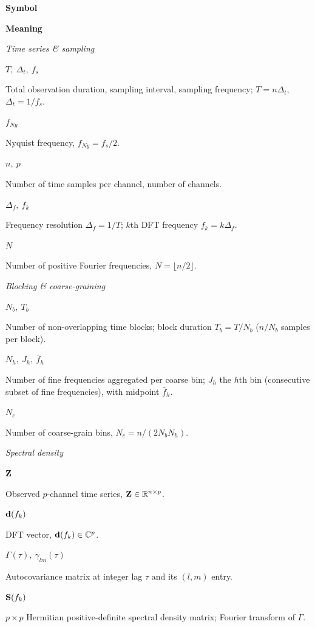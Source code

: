 \begin{table}[t]
    \centering
    \footnotesize
    \begingroup
    \setlength{\fboxsep}{6pt}%
    \newcommand{\defitem}[2]{%
        \parbox[t]{0.18\textwidth}{\raggedright #1}\hfill
        \parbox[t]{0.78\textwidth}{\raggedright #2}\par\smallskip
    }
    \newcommand{\groupplain}[2]{%
        \par\addvspace{2pt}%
        \noindent\parbox{\textwidth}{\textit{#1}\par\smallskip #2}\par
        \addvspace{2pt}%
    }
    \newcommand{\groupshaded}[2]{%
        \par\addvspace{2pt}%
        \noindent\colorbox{gray!8}{%
            \parbox{\dimexpr\textwidth-2\fboxsep\relax}{%
                \textit{#1}\par\smallskip #2%
            }%
        }\par
        \addvspace{2pt}%
    }
    \noindent\hrulefill\par\smallskip
    \noindent\parbox[t]{0.18\textwidth}{\textbf{Symbol}}\hfill
    \parbox[t]{0.78\textwidth}{\textbf{Meaning}}\par\smallskip
    \hrulefill\par\smallskip

    \groupshaded{Time series \& sampling}{%
        \defitem{$T,\ \Delta_t,\ f_s$}{Total observation duration, sampling interval, sampling frequency; $T=n\Delta_t$, $\Delta_t=1/f_s$.}
        \defitem{$f_{Ny}$}{Nyquist frequency, $f_{Ny}=f_s/2$.}
        \defitem{$n,\ p$}{Number of time samples per channel, number of channels.}
        \defitem{$\Delta_f,\ f_k$}{Frequency resolution $\Delta_f=1/T$; $k$th DFT frequency $f_k=k\Delta_f$.}
        \defitem{$N$}{Number of positive Fourier frequencies, $N=\lfloor n/2\rfloor$.}
    }

    \groupplain{Blocking \& coarse-graining}{%
        \defitem{$N_b,\ T_b$}{Number of non-overlapping time blocks; block duration $T_b=T/N_b$ ($n/N_b$ samples per block).}
        \defitem{$N_h,\ J_h,\ \bar{f}_h$}{Number of fine frequencies aggregated per coarse bin; $J_h$ the $h$th bin (consecutive subset of fine frequencies), with midpoint $\bar f_h$.}
        \defitem{$N_c$}{Number of coarse-grain bins, $N_c=n/(2N_bN_h)$.}
    }

    \groupshaded{Spectral density}{%
        \defitem{$\Z$}{Observed $p$-channel time series, $\Z\in\mathbb{R}^{n\times p}$.}
        \defitem{$\d(f_k)$}{DFT vector, $\d(f_k)\in\mathbb{C}^p$.}
        \defitem{$\Gamma(\tau),\ \gamma_{lm}(\tau)$}{Autocovariance matrix at integer lag $\tau$ and its $(l,m)$ entry.}
        \defitem{$\S(f_k)$}{$p\times p$ Hermitian positive-definite spectral density matrix; Fourier transform of $\Gamma$.}
    }


\end{table}

